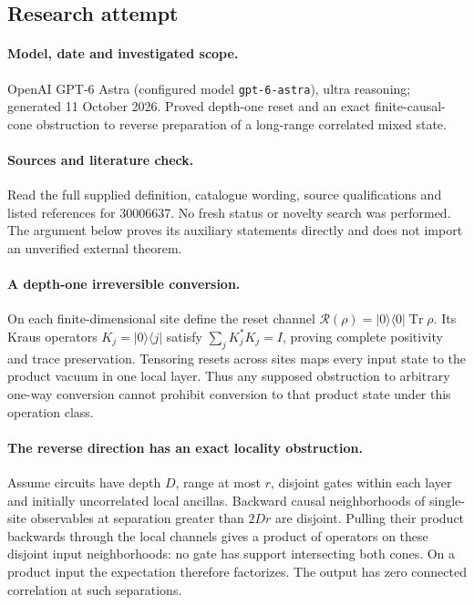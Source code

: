 \documentclass[11pt]{article}
\begin{document}
\subsection{Research attempt}
\paragraph{Model, date and investigated scope.}
OpenAI GPT-6 Astra (configured model \texttt{gpt-6-astra}), ultra reasoning; generated 11 October 2026. Proved depth-one reset and an exact finite-causal-cone obstruction to reverse preparation of a long-range correlated mixed state.

\paragraph{Sources and literature check.}
Read the full supplied definition, catalogue wording, source qualifications and listed references for 30006637. No fresh status or novelty search was performed. The argument below proves its auxiliary statements directly and does not import an unverified external theorem.

\paragraph{A depth-one irreversible conversion.} On each finite-dimensional site define the reset channel \(\mathcal R(\rho)=|0\rangle\langle0|\operatorname{Tr}\rho\). Its Kraus operators \(K_j=|0\rangle\langle j|\) satisfy \(\sum_jK_j^*K_j=I\), proving complete positivity and trace preservation. Tensoring resets across sites maps every input state to the product vacuum in one local layer. Thus any supposed obstruction to arbitrary one-way conversion cannot prohibit conversion to that product state under this operation class.
\paragraph{The reverse direction has an exact locality obstruction.} Assume circuits have depth \(D\), range at most \(r\), disjoint gates within each layer and initially uncorrelated local ancillas. Backward causal neighborhoods of single-site observables at separation greater than \(2Dr\) are disjoint. Pulling their product backwards through the local channels gives a product of operators on these disjoint input neighborhoods: no gate has support intersecting both cones. On a product input the expectation therefore factorizes. The output has zero connected correlation at such separations.
\end{document}
